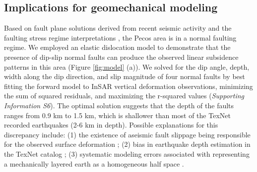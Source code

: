 \documentclass{utexasthesis}
\begin{document}
\subsection{Implications for geomechanical modeling}
Based on fault plane solutions derived from recent seismic activity and the faulting stress regime interpretations \cite{LundSnee2018}, the Pecos area is in a normal faulting regime. We employed an elastic dislocation model \cite{Okada1992} to demonstrate that the presence of dip-slip normal faults can produce the observed linear subsidence patterns in this area (Figure \ref{fig:model} (a)). We solved for the dip angle, depth, width along the dip direction, and slip magnitude of four normal faults by best fitting the forward model to InSAR vertical deformation observations, minimizing the sum of squared residuals, and maximizing the r-squared values \cite{Du1992} (\textit{Supporting Information S6}). The optimal solution suggests that the depth of the faults ranges from 0.9 km to 1.5 km, which is shallower than most of the TexNet recorded earthquakes (2-6 km in depth). Possible explanations for this discrepancy include: (1) the existence of aseismic fault slippage being responsible for the observed surface deformation \cite{mcgarr2018injection}; (2) bias in earthquake depth estimation in the TexNet catalog \cite{Lomax2019}; (3) systematic modeling errors associated with representing a mechanically layered earth as a homogeneous half space \cite{Du1992}. 
\end{document}

